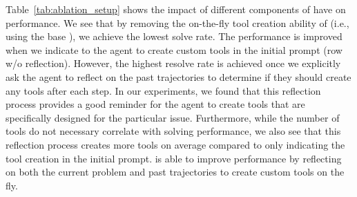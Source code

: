 Table~\ref{tab:ablation_setup} shows the impact of different components of \tech have on performance.
We see that by removing the on-the-fly tool creation ability of \tech (i.e., using the base \minisweagent), we achieve the lowest solve rate.
The performance is improved when we indicate to the agent to create custom tools in the initial prompt (row \tech w/o reflection).
However, the highest resolve rate is achieved once we explicitly ask the agent to reflect on the past trajectories to determine if they should create any tools after each step.
In our experiments, we found that this reflection process provides a good reminder for the agent to create tools that are specifically designed for the particular issue.
Furthermore, while the number of tools do not necessary correlate with solving performance, we also see that this reflection process creates more tools on average compared to only indicating the tool creation in the initial prompt. 
\tech is able to improve performance by reflecting on both the current problem and past trajectories to create custom tools on the fly.

\begin{table}[t!]
\centering
\caption{Ablation result across different \llm backends on subset of \swebench Verified problems}
\label{tab:ablation_llm}
\end{table}

